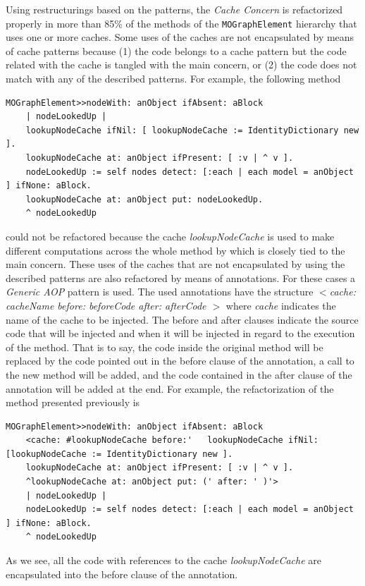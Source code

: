 \documentclass[preprint,10pt]{sigplanconf}
\newcommand{\ct}{\lstinline[backgroundcolor=\color{white},basicstyle=\footnotesize\ttfamily]}
\begin{document}
Using restructurings based on the patterns, the \emph{Cache Concern} is refactorized
properly in more than 85\% of the methods of the \ct{MOGraphElement} hierarchy that uses one or more caches.
Some uses of the caches are not encapsulated by means of 
cache patterns because (1) the code belongs to a cache pattern but the code related with the cache is tangled with the main concern, or (2) the code does not match with any of the described patterns. For example, the following method
\begin{lstlisting} 
MOGraphElement>>nodeWith: anObject ifAbsent: aBlock  
	| nodeLookedUp |
	lookupNodeCache ifNil: [ lookupNodeCache := IdentityDictionary new ].
	lookupNodeCache at: anObject ifPresent: [ :v | ^ v ].
	nodeLookedUp := self nodes detect: [:each | each model = anObject ] ifNone: aBlock.
	lookupNodeCache at: anObject put: nodeLookedUp.
	^ nodeLookedUp
\end{lstlisting}
could not be refactored because the cache \emph{lookupNodeCache} is used to make different computations across the whole
method by which is closely tied to the main concern. 
These uses of the caches that are not encapsulated
by using the described patterns are also refactored by means of annotations. For these cases
a \emph{Generic AOP} pattern is used. The used annotations have the structure
\emph{$<$cache: cacheName before: beforeCode after: afterCode $>$} where \emph{cache}
indicates the name of the cache to be injected. The before and after clauses
 indicate the source code that will be injected and
when it will be injected in regard to the execution of the method.
That is to say, the code inside the original method will be replaced
by the code pointed out in the before clause of the annotation, a call
to the new method will be added, and the code contained in the after
clause of the annotation will be added at the end. For example, the refactorization of the method presented previously is
\begin{lstlisting} 
MOGraphElement>>nodeWith: anObject ifAbsent: aBlock  
	<cache: #lookupNodeCache before:'	lookupNodeCache ifNil: [lookupNodeCache := IdentityDictionary new ]. 			
	lookupNodeCache at: anObject ifPresent: [ :v | ^ v ]. 
	^lookupNodeCache at: anObject put: (' after: ' )'>
	| nodeLookedUp |
	nodeLookedUp := self nodes detect: [:each | each model = anObject ] ifNone: aBlock.
	^ nodeLookedUp
\end{lstlisting}
As we see, all the code with references to the cache  \emph{lookupNodeCache} are encapsulated into the before clause of the annotation.
\end{document}
